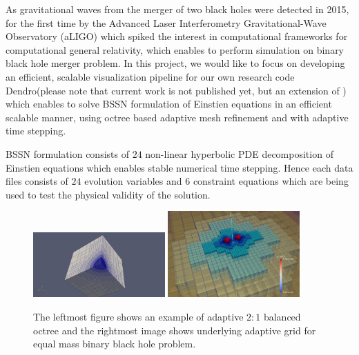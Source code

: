 As gravitational waves from the merger of two black holes were detected in 2015, for the first time by the Advanced Laser Interferometry Gravitational-Wave Observatory (aLIGO) which spiked the interest in computational frameworks for computational general relativity, which enables to perform simulation on binary black hole merger problem. In this project, we would like to focus on developing an efficient, scalable visualization pipeline for our own research code Dendro(please note that current work is not published yet, but an extension of \cite{Fernando:2017:MAA:3078597.3078610}) which enables to solve BSSN\cite{2012PhRvD..85h4004B} formulation of Einstien equations in an efficient scalable manner, using octree based adaptive mesh refinement and with adaptive time stepping. 

BSSN formulation consists of $24$ non-linear hyperbolic PDE decomposition of Einstien equations which enables stable numerical time stepping. Hence each data files consists of $24$ evolution variables and $6$ constraint equations which are being used to test the physical validity of the solution. 

\begin{figure}[H]
	\centering
	\includegraphics[width=0.45\textwidth]{figs/aoctree.jpg}  \hfill
	\includegraphics[width=0.45\textwidth]{figs/bh_image.jpg}
	\caption{\label{fig:octree} The leftmost figure shows an example of adaptive $2:1$ balanced octree and the rightmost image shows underlying adaptive grid for equal mass binary black hole problem.  }
\end{figure}